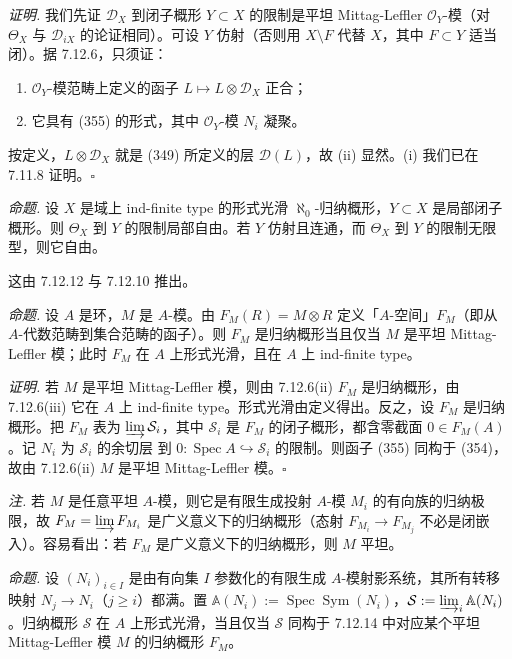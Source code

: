 \emph{证明.} 我们先证 $\mathcal{D}_X$ 到闭子概形 $Y\subset X$ 的限制是平坦 Mittag-Leffler $\mathcal{O}_Y$-模（对 $\Theta_X$ 与 $\mathcal{D}_{iX}$ 的论证相同）。可设 $Y$ 仿射（否则用 $X\setminus F$ 代替 $X$，其中 $F\subset Y$ 适当闭）。据 7.12.6，只须证：
\begin{enumerate}[label=(\roman*),leftmargin=2.2em]
\item $\mathcal{O}_Y$-模范畴上定义的函子 $L\mapsto L\otimes\mathcal{D}_X$ 正合；
\item 它具有 (355) 的形式，其中 $\mathcal{O}_Y$-模 $N_i$ 凝聚。
\end{enumerate}
按定义，$L\otimes\mathcal{D}_X$ 就是 (349) 所定义的层 $\mathcal{D}(L)$，故 (ii) 显然。(i) 我们已在 7.11.8 证明。\hfill$\square$

 \emph{命题.} 设 $X$ 是域上 ind-finite type 的形式光滑 $\aleph_0$-归纳概形，$Y\subset X$ 是局部闭子概形。则 $\Theta_X$ 到 $Y$ 的限制局部自由。若 $Y$ 仿射且连通，而 $\Theta_X$ 到 $Y$ 的限制无限型，则它自由。

这由 7.12.12 与 7.12.10 推出。

 \emph{命题.} 设 $A$ 是环，$M$ 是 $A$-模。由 $F_M(R)=M\otimes R$ 定义「$A$-空间」$F_M$（即从 $A$-代数范畴到集合范畴的函子）。则 $F_M$ 是归纳概形当且仅当 $M$ 是平坦 Mittag-Leffler 模；此时 $F_M$ 在 $A$ 上形式光滑，且在 $A$ 上 ind-finite type。

\emph{证明.} 若 $M$ 是平坦 Mittag-Leffler 模，则由 7.12.6(ii) $F_M$ 是归纳概形，由 7.12.6(iii) 它在 $A$ 上 ind-finite type。形式光滑由定义得出。反之，设 $F_M$ 是归纳概形。把 $F_M$ 表为 $\varinjlim\mathcal{S}_i$，其中 $\mathcal{S}_i$ 是 $F_M$ 的闭子概形，都含零截面 $0\in F_M(A)$。记 $N_i$ 为 $\mathcal{S}_i$ 的余切层%
%
到 $0:\operatorname{Spec}A\hookrightarrow\mathcal{S}_i$ 的限制。则函子 (355) 同构于 (354)，故由 7.12.6(ii) $M$ 是平坦 Mittag-Leffler 模。\hfill$\square$

\emph{注.} 若 $M$ 是任意平坦 $A$-模，则它是有限生成投射 $A$-模 $M_i$ 的有向族的归纳极限，故 $F_M=\varinjlim F_{M_i}$ 是广义意义下的归纳概形（态射 $F_{M_i}\to F_{M_j}$ 不必是闭嵌入）。容易看出：若 $F_M$ 是广义意义下的归纳概形，则 $M$ 平坦。

 \emph{命题.} 设 $(N_i)_{i\in I}$ 是由有向集 $I$ 参数化的有限生成 $A$-模射影系统，其所有转移映射 $N_j\to N_i$（$j\ge i$）都满。置 $\mathbb{A}(N_i):=\operatorname{Spec}\operatorname{Sym}(N_i)$，$\mathcal{S}:=\varinjlim_i\mathbb{A}(N_i)$。归纳概形 $\mathcal{S}$ 在 $A$ 上形式光滑，当且仅当 $\mathcal{S}$ 同构于 7.12.14 中对应某个平坦 Mittag-Leffler 模 $M$ 的归纳概形 $F_M$。

